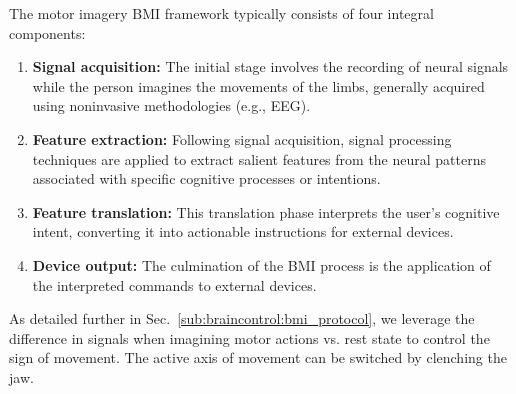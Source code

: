 \documentclass[letterpaper, 10pt, conference]{ieeeconf}      %
\begin{document}
The motor imagery \gls{BMI} framework typically consists of four integral components:

\begin{enumerate}
    \item \textbf{Signal acquisition:} The initial stage involves the recording of neural signals while the person imagines the movements of the limbs, generally acquired using noninvasive methodologies (e.g., \gls{EEG}).
    \item \textbf{Feature extraction:} Following signal acquisition, signal processing techniques are applied to extract salient features from the neural patterns associated with specific cognitive processes or intentions.
    \item \textbf{Feature translation:} This translation phase interprets the user's cognitive intent, converting it into actionable instructions for external devices.
    \item \textbf{Device output:} The culmination of the \gls{BMI} process is the application of the interpreted commands to external devices. 
\end{enumerate}

As detailed further in Sec.~\ref{sub:braincontrol:bmi_protocol}, we leverage the difference in signals when imagining motor actions vs. rest state to control the sign of movement. The active axis of movement can be switched by clenching the jaw. %

\end{document}
